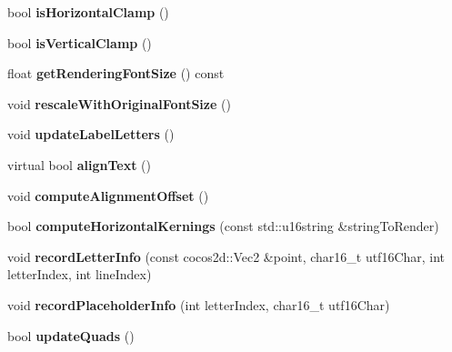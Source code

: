 \begin{DoxyCompactItemize}
\item 
\mbox{\label{classLabel_a70cebb4ec38fe9ea16124c42ec8fb33f}} 
bool {\bfseries is\+Horizontal\+Clamp} ()
\item 
\mbox{\label{classLabel_ae5da5e8feecd5920580110839b2bced8}} 
bool {\bfseries is\+Vertical\+Clamp} ()
\item 
\mbox{\label{classLabel_a832e00fc1f2944499ed96871cdc43fa8}} 
float {\bfseries get\+Rendering\+Font\+Size} () const
\item 
\mbox{\label{classLabel_a0b96108b1acb82b4f007aacf7ef47f14}} 
void {\bfseries rescale\+With\+Original\+Font\+Size} ()
\item 
\mbox{\label{classLabel_a4c2270ce1600549530adcfa58f861352}} 
void {\bfseries update\+Label\+Letters} ()
\item 
\mbox{\label{classLabel_a28a7796a850cc2388fbfedbdeb723c16}} 
virtual bool {\bfseries align\+Text} ()
\item 
\mbox{\label{classLabel_adcd7527d05bed63dc12aef0cb0c7a38a}} 
void {\bfseries compute\+Alignment\+Offset} ()
\item 
\mbox{\label{classLabel_aa0a079282ee8c09cb361304f6efa033d}} 
bool {\bfseries compute\+Horizontal\+Kernings} (const std\+::u16string \&string\+To\+Render)
\item 
\mbox{\label{classLabel_ab49f4963f845941369602371c126482f}} 
void {\bfseries record\+Letter\+Info} (const cocos2d\+::\+Vec2 \&point, char16\+\_\+t utf16\+Char, int letter\+Index, int line\+Index)
\item 
\mbox{\label{classLabel_a2f0d98c262065400c085d0e7daad01f7}} 
void {\bfseries record\+Placeholder\+Info} (int letter\+Index, char16\+\_\+t utf16\+Char)
\item 
\mbox{\label{classLabel_afeb07526c7455452ee5546f5a81f6cd5}} 
bool {\bfseries update\+Quads} ()
\item 
\mbox{\label{classLabel_a23d6bc9e3ef5ebd8b73ae0ca532f942a}} 

\end{DoxyCompactItemize}
